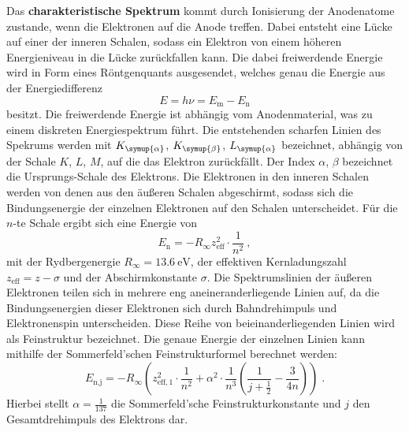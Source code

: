     \label{sec:theorie:char_spektrum}
    Das \textbf{charakteristische Spektrum} kommt durch Ionisierung der Anodenatome zustande,
    wenn die Elektronen auf die Anode treffen.
    Dabei entsteht eine Lücke auf einer der inneren Schalen,
    sodass ein Elektron von einem höheren Energieniveau in die Lücke zurückfallen kann.
    Die dabei freiwerdende Energie wird in Form eines Röntgenquants ausgesendet,
    welches genau die Energie aus der Energiedifferenz
    \begin{equation*}
        E = h \nu = E_\text{m} - E_\text{n}
    \end{equation*}
    besitzt.
    Die freiwerdende Energie ist abhängig vom Anodenmaterial,
    was zu einem diskreten Energiespektrum führt.
    Die entstehenden scharfen Linien des Spekrums werden mit
    $K_{\symup{\alpha}}$, $K_{\symup{\beta}}$, $L_{\symup{\alpha}}$ bezeichnet,
    abhängig von der Schale $K$, $L$, $M$,
    auf die das Elektron zurückfällt.
    Der Index $\alpha$, $\beta$ bezeichnet die Ursprungs-Schale des Elektrons.
    Die Elektronen in den inneren Schalen werden von denen aus den äußeren Schalen abgeschirmt,
    sodass sich die Bindungsenergie der einzelnen Elektronen auf den Schalen unterscheidet.
    Für die $n$-te Schale ergibt sich eine Energie von
    \begin{equation}
        \label{eqn:E_n}
        E_\text{n} = - R_\infty z_{\text{eff}}^2 \cdot \frac{1}{n^2} \ ,
    \end{equation}
    mit der Rydbergenergie $R_\infty = \SI{13.6}{\electronvolt}$,
    der effektiven Kernladungszahl $z_{\text{eff}} = z - \sigma$ und der Abschirmkonstante $\sigma$.
    Die Spektrumslinien der äußeren Elektronen teilen sich in mehrere eng aneineranderliegende Linien auf,
    da die Bindungsenergien dieser Elektronen sich durch Bahndrehimpuls und Elektronenspin unterscheiden.
    Diese Reihe von beieinanderliegenden Linien wird als Feinstruktur bezeichnet.
    Die genaue Energie der einzelnen Linien kann mithilfe der Sommerfeld'schen Feinstrukturformel berechnet werden:
    \begin{equation}
        \label{eqn:Feinstrukturformel}
        E_\text{n,j} = - R_\infty
        \left(z_{\text{eff},1}^2 \cdot \frac{1}{n^2} + \alpha^2 \cdot \frac{1}{n^3}
          \left( \frac{1}{j+\frac{1}{2}}- \frac{3}{4n} \right)
        \right) \; .
    \end{equation}
    Hierbei stellt $\alpha = \frac{1}{137}$ die Sommerfeld'sche Feinstrukturkonstante und $j$ den Gesamtdrehimpuls des Elektrons dar.
